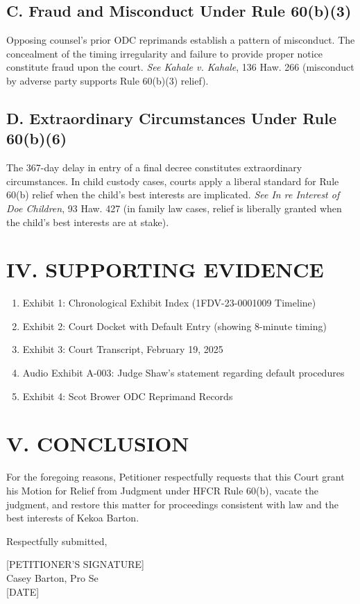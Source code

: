\documentclass[12pt]{article}
\begin{document}
\subsection*{C. Fraud and Misconduct Under Rule 60(b)(3)}

Opposing counsel's prior ODC reprimands establish a pattern of misconduct. The concealment of the timing irregularity and failure to provide proper notice constitute fraud upon the court. \textit{See Kahale v. Kahale}, 136 Haw. 266 (misconduct by adverse party supports Rule 60(b)(3) relief).

\subsection*{D. Extraordinary Circumstances Under Rule 60(b)(6)}

The 367-day delay in entry of a final decree constitutes extraordinary circumstances. In child custody cases, courts apply a liberal standard for Rule 60(b) relief when the child's best interests are implicated. \textit{See In re Interest of Doe Children}, 93 Haw. 427 (in family law cases, relief is liberally granted when the child's best interests are at stake).

\section*{IV. SUPPORTING EVIDENCE}

\begin{enumerate}
\item Exhibit 1: Chronological Exhibit Index (1FDV-23-0001009 Timeline)
\item Exhibit 2: Court Docket with Default Entry (showing 8-minute timing)
\item Exhibit 3: Court Transcript, February 19, 2025
\item Audio Exhibit A-003: Judge Shaw's statement regarding default procedures
\item Exhibit 4: Scot Brower ODC Reprimand Records
\end{enumerate}

\section*{V. CONCLUSION}

For the foregoing reasons, Petitioner respectfully requests that this Court grant his Motion for Relief from Judgment under HFCR Rule 60(b), vacate the judgment, and restore this matter for proceedings consistent with law and the best interests of Kekoa Barton.

\vspace{0.3in}

Respectfully submitted,

\vspace{0.4in}

\noindent\hfill [PETITIONER'S SIGNATURE]\hfill\\
\noindent\hfill Casey Barton, Pro Se\hfill\\
\noindent\hfill [DATE]\hfill\\
\end{document}
